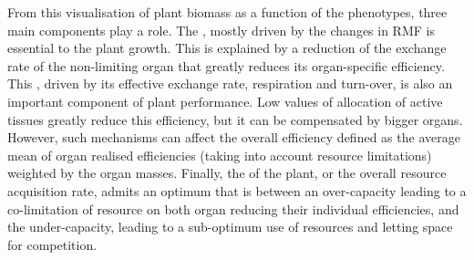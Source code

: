 From this visualisation of plant biomass as a function of the phenotypes, three main components play a role. The , mostly driven by the changes in RMF is essential to the plant growth. This is explained by a reduction of the exchange rate of the non-limiting organ that greatly reduces its organ-specific efficiency. This , driven by its effective exchange rate, respiration and turn-over, is also an important component of plant performance. Low values of allocation of active tissues greatly reduce this efficiency, but it can be compensated by bigger organs. However, such mechanisms can affect the overall efficiency defined as the average mean of organ realised efficiencies (taking into account resource limitations) weighted by the organ masses. Finally, the  of the plant, or the overall resource acquisition rate, admits an optimum that is between an over-capacity leading to a co-limitation of resource on both organ reducing their individual efficiencies, and the under-capacity, leading to a sub-optimum use of resources and letting space for competition.






%
%
%
%
%

